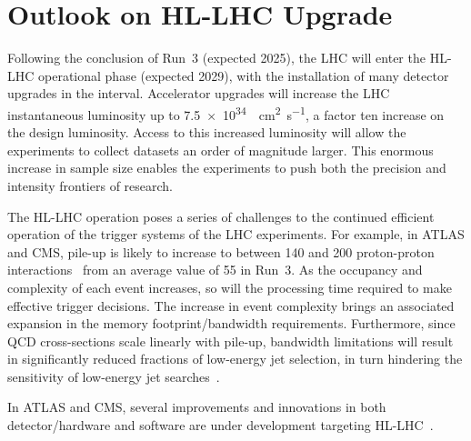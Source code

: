 \section{Outlook on HL-LHC Upgrade}



Following the conclusion of Run~3 (expected 2025), the LHC will enter the HL-LHC operational phase (expected 2029), with the installation of many detector upgrades in the interval. Accelerator upgrades will increase the LHC instantaneous luminosity up to \SI{7.5e34}{\per\square\cm\per\second}, a factor ten increase on the design luminosity. Access to this increased luminosity will allow the experiments to collect datasets an order of magnitude larger. This enormous increase in sample size enables the experiments to push both the precision and intensity frontiers of research.

The HL-LHC operation poses a series of challenges to the continued efficient operation of the trigger systems of the LHC experiments. For example, in ATLAS and CMS, pile-up is likely to increase to between 140 and 200 proton-proton interactions~\cite{ATLAS:pileup} from an average value of 55 in Run~3. As the occupancy and complexity of each event increases, so will the processing time required to make effective trigger decisions. %
The increase in event complexity brings an associated expansion in the memory footprint/bandwidth requirements. 
Furthermore, since QCD cross-sections scale linearly with pile-up, bandwidth limitations will result in significantly reduced fractions of low-energy jet selection, in turn hindering the sensitivity of low-energy jet searches~\cite{albrecht2018hep}.

In ATLAS and CMS, several improvements and innovations in both detector/hardware and software are under development targeting HL-LHC~\cite{hl-lhc}.

